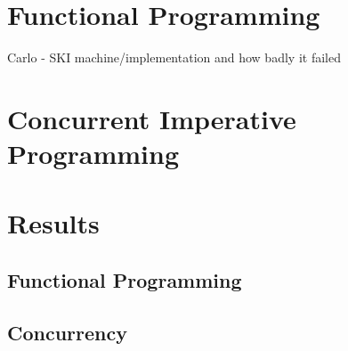 \documentclass{article}
\begin{document}
\section{Functional Programming}

Carlo - SKI machine/implementation and how badly it failed

\section{Concurrent Imperative Programming}



\section{Results}

\subsection{Functional Programming}

\subsection{Concurrency}


{}

\end{document}
